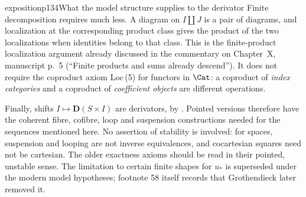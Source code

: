 \begin{dcomment}{exposition}{p134}{What the model structure supplies to the derivator}
Finite decomposition requires much less. A diagram on $I\amalg J$ is a pair of diagrams, and localization at the corresponding product class gives the product of the two localizations when identities belong to that class. This is the finite-product localization argument already discussed in the commentary on Chapter~X, manuscript p.~5 (``Finite products and sums already descend''). It does not require the coproduct axiom Loc\,(5) for functors in $\Cat$: a coproduct of \emph{index categories} and a coproduct of \emph{coefficient objects} are different operations.

Finally, shifts $I\mapsto\mathbf D(S\times I)$ are derivators, by \citet[Theorem 1.25]{Groth2013}. Pointed versions therefore have the coherent fibre, cofibre, loop and suspension constructions needed for the sequences mentioned here. No assertion of stability is involved: for spaces, suspension and looping are not inverse equivalences, and cocartesian squares need not be cartesian. The older exactness axioms should be read in their pointed, unstable sense. The limitation to certain finite shapes for $u_*$ is superseded under the modern model hypotheses; footnote 58 itself records that Grothendieck later removed it.
\end{dcomment}

